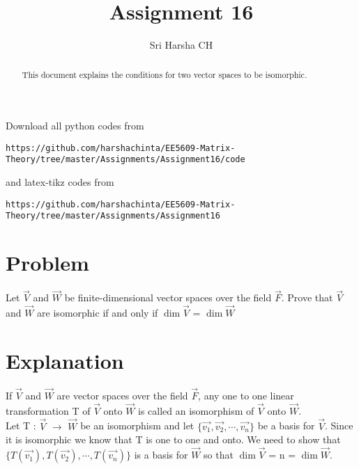 \documentclass[journal,12pt,twocolumn]{IEEEtran}
\begin{document}
\renewcommand{\thefigure}{\theproblem}

\def\putbox#1#2#3{\makebox[0in][l]{\makebox[#1][l]{}\raisebox{\baselineskip}[0in][0in]{\raisebox{#2}[0in][0in]{#3}}}}
     \def\rightbox#1{\makebox[0in][r]{#1}}
     \def\centbox#1{\makebox[0in]{#1}}
     \def\topbox#1{\raisebox{-\baselineskip}[0in][0in]{#1}}
     \def\midbox#1{\raisebox{-0.5\baselineskip}[0in][0in]{#1}}
\vspace{3cm}
\title{Assignment 16}
\author{Sri Harsha CH}

\maketitle
\newpage

\bigskip
\renewcommand{\thefigure}{\theenumi}
\renewcommand{\thetable}{\theenumi}

\begin{abstract}
This document explains the conditions for two vector spaces to be isomorphic. 
\end{abstract}

Download all python codes from 
\begin{lstlisting}
https://github.com/harshachinta/EE5609-Matrix-Theory/tree/master/Assignments/Assignment16/code
\end{lstlisting}
%
and latex-tikz codes from 
%
\begin{lstlisting}
https://github.com/harshachinta/EE5609-Matrix-Theory/tree/master/Assignments/Assignment16
\end{lstlisting}
%
\section{Problem}
Let $\vec{V}$ and $\vec{W}$ be finite-dimensional vector spaces over the field $\vec{F}$. Prove that $\vec{V}$ and $\vec{W}$ are isomorphic if and only if $\dim{\vec{V}}$ = $\dim{\vec{W}}$
\section{Explanation}
If $\vec{V}$ and $\vec{W}$ are vector spaces over the field $\vec{F}$, any one to one linear transformation T of $\vec{V}$ onto $\vec{W}$ is called an isomorphism of $\vec{V}$ onto $\vec{W}$.\\

Let T : $\vec{V}$ $\xrightarrow{}$ $\vec{W}$ be an isomorphism and let $\{\vec{v_1}, \vec{v_2},\cdots,\vec{v_n}\}$ be a basis for $\vec{V}$. Since it is isomorphic we know that T is one to one and onto. We need to show that  $\{T(\vec{v_1}), T(\vec{v_2}),\cdots,T(\vec{v_n})\}$ is a basis for $\vec{W}$ so that $\dim{\vec{V}}$ = n = $\dim{\vec{W}}$.\\
\end{document}
